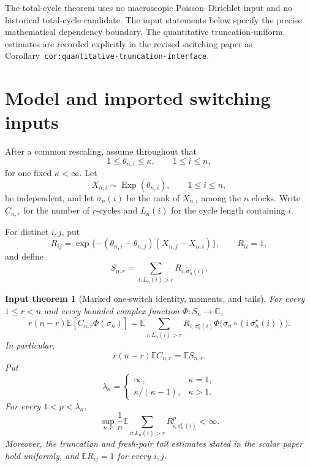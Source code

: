 \documentclass[11pt]{article}
\newtheorem{inputtheorem}[theorem]{Input theorem}
\theoremstyle{definition}
\theoremstyle{remark}
\newcommand{\Ee}{\mathbb E}
\newcommand{\Exp}{\operatorname{Exp}}
\begin{document}
The total-cycle theorem uses no macroscopic Poisson--Dirichlet input and
no historical total-cycle candidate. The input statements below specify
the precise mathematical dependency boundary. The quantitative
truncation-uniform estimates are recorded explicitly in the revised
switching paper as Corollary~\texttt{cor:quantitative-truncation-interface}.

\section{Model and imported switching inputs}

After a common rescaling, assume throughout that
\begin{equation}\label{eq:comparable}
 1\le\theta_{n,i}\le\kappa,
 \qquad 1\le i\le n,
\end{equation}
for one fixed $\kappa<\infty$.  Let
\[
 X_{n,i}\sim\Exp(\theta_{n,i}),
 \qquad 1\le i\le n,
\]
be independent, and let $\sigma_n(i)$ be the rank of $X_{n,i}$ among the
$n$ clocks.  Write $C_{n,r}$ for the number of $r$-cycles and $L_n(i)$ for
the cycle length containing $i$.

For distinct $i,j$, put
\begin{equation}\label{eq:Rij}
 R_{ij}=\exp\{-(\theta_{n,i}-\theta_{n,j})(X_{n,j}-X_{n,i})\},
 \qquad R_{ii}=1,
\end{equation}
and define
\begin{equation}\label{eq:S-n-r}
 S_{n,r}=\sum_{i:L_n(i)>r}R_{i,\sigma_n^r(i)}.
\end{equation}

\begin{inputtheorem}[Marked one-switch identity, moments, and tails]
\label{input:one-switch}
For every $1\le r<n$ and every bounded complex function
$\Phi:S_n\to\mathbb C$,
\begin{equation}\label{eq:marked-switch}
 r(n-r)\Ee[C_{n,r}\Phi(\sigma_n)]
 =\Ee\sum_{i:L_n(i)>r}
 R_{i,\sigma_n^r(i)}
 \Phi\bigl(\sigma_n\circ(i\,\sigma_n^r(i))\bigr).
\end{equation}
In particular,
\begin{equation}\label{eq:mean-switch}
 r(n-r)\Ee C_{n,r}=\Ee S_{n,r}.
\end{equation}
Put
\[
 \lambda_\kappa=
 \begin{cases}
 \infty,&\kappa=1,\\[1mm]
 \kappa/(\kappa-1),&\kappa>1.
 \end{cases}
\]
For every $1<p<\lambda_\kappa$,
\begin{equation}\label{eq:selected-p}
 \sup_{n,r}\frac1n\Ee\sum_{i:L_n(i)>r}
 R_{i,\sigma_n^r(i)}^p<\infty.
\end{equation}
Moreover, the truncation and fresh-pair tail estimates stated in the scalar
paper hold uniformly, and $\Ee R_{ij}=1$ for every $i,j$.
\end{inputtheorem}
\end{document}
